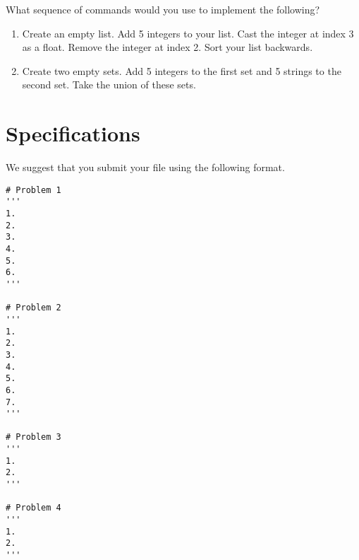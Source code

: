 \begin{problem}
What sequence of commands would you use to implement the following?

\begin{enumerate}
\item Create an empty list. 
Add 5 integers to your list. 
Cast the integer at index 3 as a float.
Remove the integer at index 2. 
Sort your list backwards. 
\item Create two empty sets.
Add 5 integers to the first set and 5 strings to the second set.
Take the union of these sets.

\end{enumerate}
\end{problem}

\section*{Specifications}
We suggest that you submit your  file using the following format.
\begin{lstlisting}
# Problem 1
'''
1. 
2. 
3. 
4. 
5. 
6. 
'''

# Problem 2	
'''
1. 
2.
3. 
4. 
5. 
6. 
7. 
'''

# Problem 3
'''	
1.
2.
'''

# Problem 4
'''
1. 
2. 
'''
\end{lstlisting}	
